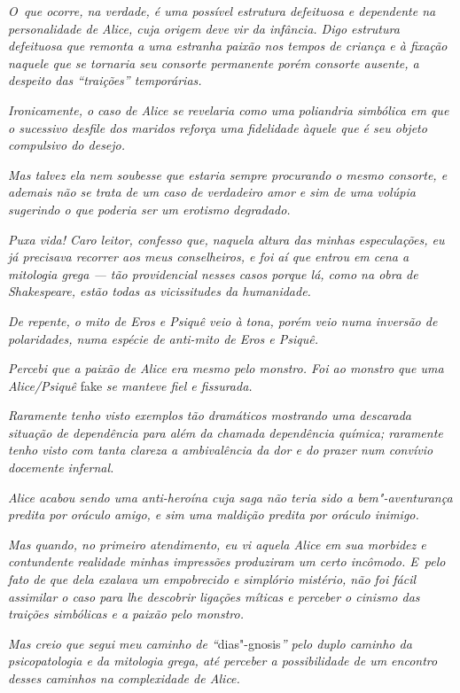 \emph{O~que ocorre, na verdade, é uma possível estrutura defeituosa e
dependente na personalidade de Alice, cuja origem deve vir da infância.
Digo estrutura defeituosa que remonta a uma estranha paixão nos tempos
de criança e à fixação naquele que se tornaria seu consorte permanente
porém consorte ausente, a despeito das ``traições'' temporárias.}

\emph{Ironicamente, o caso de Alice se revelaria como uma poliandria
simbólica em que o sucessivo desfile dos maridos reforça uma fidelidade
àquele que é seu objeto compulsivo do desejo.}

\emph{Mas talvez ela nem soubesse que estaria sempre procurando o mesmo
consorte, e ademais não se trata de um caso de verdadeiro amor e sim de
uma volúpia sugerindo o que poderia ser um erotismo degradado.}

\emph{Puxa vida! Caro leitor, confesso que, naquela altura das minhas
especulações, eu já precisava recorrer aos meus conselheiros, e foi aí
que entrou em cena a mitologia grega --- tão providencial nesses casos
porque lá, como na obra de Shakespeare, estão todas as vicissitudes da
humanidade.}

\emph{De repente, o mito de Eros e Psiquê veio à tona, porém veio numa
inversão de polaridades, numa espécie de anti-mito de Eros e Psiquê.}

\emph{Percebi que a paixão de Alice era mesmo pelo monstro. Foi ao
monstro que uma Alice/Psiquê} fake \emph{se manteve fiel e fissurada.}

\emph{Raramente tenho visto exemplos tão dramáticos mostrando uma
descarada situação de dependência para além da chamada dependência
química; raramente tenho visto com tanta clareza a ambivalência da dor e
do prazer num convívio docemente infernal.}

\emph{Alice acabou sendo uma anti-heroína cuja saga não teria sido a
bem"-aventurança predita por oráculo amigo, e sim uma maldição predita
por oráculo inimigo.}

\emph{Mas quando, no primeiro atendimento, eu vi aquela Alice em sua
morbidez e contundente realidade minhas impressões produziram um certo
incômodo. E~pelo fato de que dela exalava um empobrecido e simplório
mistério, não foi fácil assimilar o caso para lhe descobrir ligações
míticas e perceber o cinismo das traições simbólicas e a paixão pelo
monstro.}

\emph{Mas creio que segui meu caminho de ``}dias"-gnosis\emph{'' pelo
duplo caminho da psicopatologia e da mitologia grega, até perceber a
possibilidade de um encontro desses caminhos na complexidade de Alice.}

